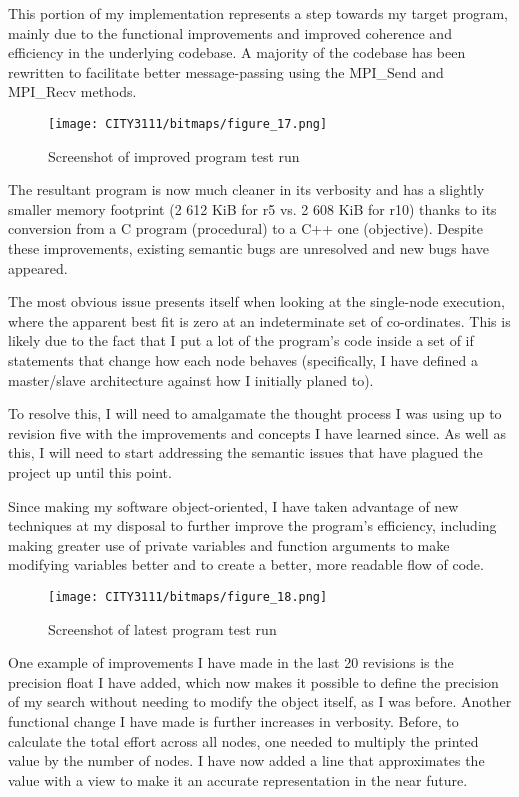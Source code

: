This portion of my implementation represents a step towards my target program, mainly due to the functional improvements and improved coherence and efficiency in the underlying codebase. A majority of the codebase has been rewritten to facilitate better message-passing using the MPI\_Send and MPI\_Recv methods.

\begin{figure}[H]
    \texttt{[image: CITY3111/bitmaps/figure\_17.png]}
    \caption{Screenshot of improved program test run}
    \label{figure_17}
\end{figure}

The resultant program is now much cleaner in its verbosity and has a slightly smaller memory footprint (2 612 KiB for r5 vs. 2 608 KiB for r10) thanks to its conversion from a C program (procedural) to a C++ one (objective). Despite these improvements, existing semantic bugs are unresolved and new bugs have appeared.

The most obvious issue presents itself when looking at the single-node execution, where the apparent best fit is zero at an indeterminate set of co-ordinates. This is likely due to the fact that I put a lot of the program's code inside a set of if statements that change how each node behaves (specifically, I have defined a master/slave architecture against how I initially planed to).

To resolve this, I will need to amalgamate the thought process I was using up to revision five with the improvements and concepts I have learned since. As well as this, I will need to start addressing the semantic issues that have plagued the project up until this point.

\textbf{}

Since making my software object-oriented, I have taken advantage of new techniques at my disposal to further improve the program's efficiency, including making greater use of private variables and function arguments to make modifying variables better and to create a better, more readable flow of code.

\begin{figure}[H]
    \texttt{[image: CITY3111/bitmaps/figure\_18.png]}
    \caption{Screenshot of latest program test run}
    \label{figure_18}
\end{figure}

One example of improvements I have made in the last 20 revisions is the precision float I have added, which now makes it possible to define the precision of my search without needing to modify the object itself, as I was before. Another functional change I have made is further increases in verbosity. Before, to calculate the total effort across all nodes, one needed to multiply the printed value by the number of nodes. I have now added a line that approximates the value with a view to make it an accurate representation in the near future.

